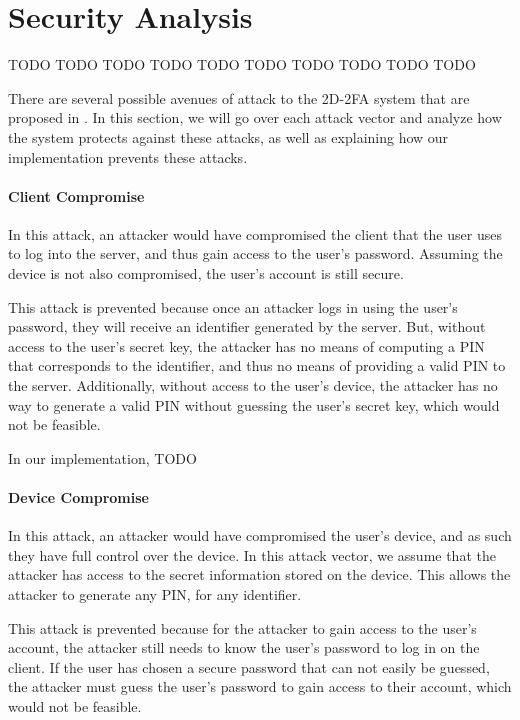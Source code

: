 \documentclass[11pt]{article} %
\begin{document}
\section{Security Analysis}

TODO TODO TODO TODO TODO TODO TODO TODO TODO TODO

There are several possible avenues of attack to the 2D-2FA system that
are proposed in \cite{shirvanian2d2fa}. In this section, we will go over
each attack vector and analyze how the system protects against these
attacks, as well as explaining how our implementation prevents these
attacks. 

\paragraph{Client Compromise}
In this attack, an attacker would have compromised the client that the
user uses to log into the server, and thus gain access to the user's
password. Assuming the device is not also compromised, the user's
account is still secure. 

This attack is prevented because once an attacker logs in using the
user's password, they will receive an identifier generated by the
server. But, without access to the user's secret key, the attacker has
no means of computing a PIN that corresponds to the identifier, and
thus no means of providing a valid PIN to the server. Additionally,
without access to the user's device, the attacker has no way to generate
a valid PIN without guessing the user's secret key, which would not be
feasible. 

In our implementation, TODO

\paragraph{Device Compromise}
In this attack, an attacker would have compromised the user's device,
and as such they have full control over the device. In this attack
vector, we assume that the attacker has access to the secret information
stored on the device. This allows the attacker to generate any PIN, for
any identifier.

This attack is prevented because for the attacker to gain access to the
user's account, the attacker still needs to know the user's password to
log in on the client. If the user has chosen a secure password that can
not easily be guessed, the attacker must guess the user's password to
gain access to their account, which would not be feasible. 
\end{document}
